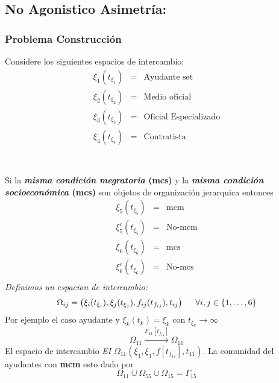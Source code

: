 \documentclass[]{article}
\begin{document}
\hrulefill 
\subsection{No Agonistico Asimetr\'ia:}
\subsubsection{Problema Construcci\'on}
Considere los siguientes espacios de intercambio: \\

\begin{eqnarray*}
		\xi_1(t_{\xi_1})&=& \text{Ayudante set}\\
		\xi_2(t_{\xi_2})&=& \text{Medio oficial}\\
		\xi_3(t_{\xi_3})&=& \text{Oficial Especializado}\\
		\xi_4(t_{\xi_4})&=& \text{Contratista}\\
\end{eqnarray*}
\\
\emph{\underline{}}\\
Si la \textbf{ \textit{misma condici\'on megratoria} (mcs)} y la \textbf{ \textit{misma condici\'on socioecon\'omica} (mcs)} son objetos de organizaci\'on jerarquica entonces
\begin{eqnarray*}
	\xi_5(t_{\xi_5})&=&\text{mcm}\\
	\xi_5^c(t_{\xi_5})&=&\text{No-mcm}\\
	\xi_6(t_{\xi_6})&=&\text{mcs}\\
	\xi_6^c(t_{\xi_6})&=&\text{No-mcs}\\
\end{eqnarray*} 
\emph{Definimos un espacion de intercambio:}\\
\begin{equation}
	\Omega_{ij} = \left( \xi_i (t_{\xi_i} ), \xi_j (t_{\xi_j}), f_{ij}(t_{f_{ij}}), t_{ij} \right) \hspace{0.5cm} \forall i, j \in \{1,\dots,6\}
\end{equation}
Por ejemplo el caso ayudante y $\xi_k(t_k)=\xi_k$ con $t_{\xi_k}\rightarrow \infty$
\begin{equation}
	\Omega_{11}\xrightarrow{F_{11}[t_{f_{11}}]}\Omega_{11}
\end{equation}
El espacio de intercambio \textit{EI} $\Omega_{11} (\xi_1, \xi_1, f[t_{f_{11}}], t_11)$. La comunidad del ayudantes con \textbf{mcm} esto dado por 
\begin{equation}
	\Omega_{11} \cup \Omega_{55} \cup \Omega_15 = \Gamma_{15}
\end{equation} 
\begin{center}
\end{center}
\end{document}
